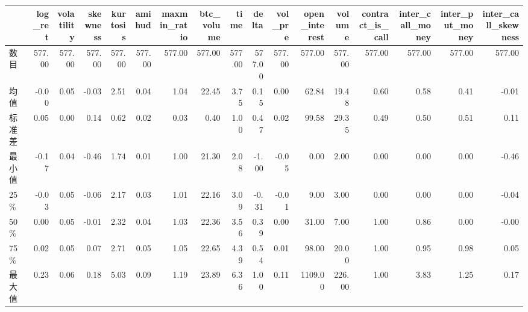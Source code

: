 \begin{tabular}{lrrrrrrrrrrrrrrrr}
\toprule
{} &  log\_ret &  volatility &  skewness &  kurtosis &  amihud &  maxmin\_ratio &  btc\_volume &   time &  delta &  vol\_pre &  open\_interest &  volume &  contract\_is\_call &  inter\_call\_money &  inter\_put\_money &  inter\_call\_skewness \\
\midrule
数目 &   577.00 &      577.00 &    577.00 &    577.00 &  577.00 &        577.00 &      577.00 & 577.00 & 577.00 &   577.00 &         577.00 &  577.00 &            577.00 &            577.00 &           577.00 &               577.00 \\
均值  &    -0.00 &        0.05 &     -0.03 &      2.51 &    0.04 &          1.04 &       22.45 &   3.75 &   0.15 &     0.00 &          62.84 &   19.48 &              0.60 &              0.58 &             0.41 &                -0.01 \\
标准差   &     0.05 &        0.00 &      0.14 &      0.62 &    0.02 &          0.03 &        0.40 &   1.00 &   0.47 &     0.02 &          99.58 &   29.35 &              0.49 &              0.50 &             0.51 &                 0.11 \\
最小值   &    -0.17 &        0.04 &     -0.46 &      1.74 &    0.01 &          1.00 &       21.30 &   2.08 &  -1.00 &    -0.05 &           0.00 &    2.00 &              0.00 &              0.00 &             0.00 &                -0.46 \\
25\%   &    -0.03 &        0.05 &     -0.06 &      2.17 &    0.03 &          1.01 &       22.16 &   3.09 &  -0.31 &    -0.01 &           9.00 &    3.00 &              0.00 &              0.00 &             0.00 &                -0.04 \\
50\%   &     0.00 &        0.05 &     -0.01 &      2.32 &    0.04 &          1.03 &       22.36 &   3.56 &   0.39 &     0.00 &          31.00 &    7.00 &              1.00 &              0.86 &             0.00 &                -0.00 \\
75\%   &     0.02 &        0.05 &      0.07 &      2.71 &    0.05 &          1.05 &       22.65 &   4.39 &   0.54 &     0.01 &          98.00 &   20.00 &              1.00 &              0.95 &             0.98 &                 0.05 \\
最大值   &     0.23 &        0.06 &      0.18 &      5.03 &    0.09 &          1.19 &       23.89 &   6.36 &   1.00 &     0.11 &        1109.00 &  226.00 &              1.00 &              3.83 &             1.25 &                 0.17 \\
\bottomrule
\end{tabular}
